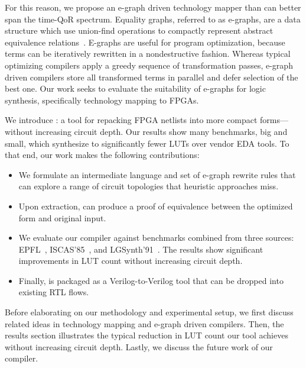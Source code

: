 For this reason, we propose an e-graph driven technology mapper than can better
span the time-QoR spectrum. Equality graphs, referred to as e-graphs, are a
data structure which use union-find operations to compactly represent abstract
equivalence relations~\cite{eggpaper}. E-graphs are useful for program
optimization, because terms can be iteratively rewritten in a nondestructive
fashion. Whereas typical optimizing compilers apply a greedy sequence of
transformation passes, e-graph driven compilers store all transformed terms in
parallel and defer selection of the best one. Our work seeks to evaluate the
suitability of e-graphs for logic synthesis, specifically technology mapping to
FPGAs.

We introduce \shortname{}: a tool for repacking FPGA netlists into more compact
forms---without increasing circuit depth. Our results show many benchmarks, big
and small, which synthesize to significantly fewer LUTs over vendor EDA tools.
To that end, our work makes the following contributions:

\begin{itemize}
    \item We formulate an intermediate language and set of e-graph rewrite rules that can
          explore a range of circuit topologies that heuristic approaches miss.
    \item Upon extraction, \shortname{} can produce a proof of equivalence between the
          optimized form and original input.
    \item We evaluate our compiler against \nbenchmarks{} benchmarks combined from three
          sources: EPFL~\cite{epflbench}, ISCAS'85~\cite{iscasbench}, and
          LGSynth'91~\cite{lgsynthbench}. The results show significant improvements in
          LUT count without increasing circuit depth.
    \item Finally, \shortname{} is packaged as a Verilog-to-Verilog tool that can be
          dropped into existing RTL flows. 
\end{itemize}

Before elaborating on our methodology and experimental setup, we first discuss
related ideas in technology mapping and e-graph driven compilers. Then, the
results section illustrates the typical reduction in LUT count our tool
achieves without increasing circuit depth. Lastly, we discuss the future work
of our compiler.